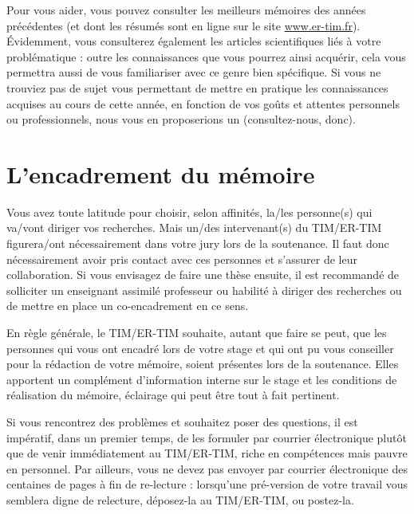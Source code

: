 \documentclass{report}
\begin{document}
Pour vous aider, vous pouvez consulter les meilleurs mémoires des années précédentes (et dont les résumés sont en ligne sur le site \url{www.er-tim.fr}). \'Evidemment, vous consulterez également les articles scientifiques liés à votre problématique : outre les connaissances que vous pourrez ainsi acquérir, cela vous permettra aussi de vous familiariser avec ce genre bien spécifique. Si vous ne trouviez pas de sujet vous permettant de mettre en pratique les connaissances acquises au cours de cette année, en fonction de vos goûts et attentes personnels ou professionnels, nous vous en proposerions un (consultez-nous, donc).

\section{L'encadrement du mémoire}
Vous avez toute latitude pour choisir, selon affinités, la/les personne(s) qui va/vont diriger vos recherches. Mais un/des intervenant(s) du TIM/ER-TIM figurera/ont nécessairement dans votre jury lors de la soutenance. Il faut donc nécessairement avoir pris contact avec ces personnes et s'assurer de leur collaboration. Si vous envisagez de faire une thèse ensuite, il est recommandé de solliciter un enseignant assimilé professeur ou habilité à diriger des recherches ou de mettre en place un co-encadrement en ce sens.

En règle générale, le TIM/ER-TIM souhaite, autant que faire se peut, que les personnes qui vous ont encadré lors de votre stage et qui ont pu vous conseiller pour la rédaction de votre mémoire, soient présentes lors de la soutenance. Elles apportent un complément d'information interne sur le stage et les conditions de réalisation du mémoire, éclairage qui peut être tout à fait pertinent.

Si vous rencontrez des problèmes et souhaitez poser des questions, il est impératif, dans un premier temps, de les formuler par courrier électronique plutôt que de venir immédiatement au TIM/ER-TIM, riche en compétences mais pauvre en personnel. Par ailleurs, vous ne devez pas envoyer par courrier électronique des centaines de pages à fin de re-lecture : lorsqu'une pré-version de votre travail vous semblera digne de relecture, déposez-la au TIM/ER-TIM, ou postez-la.
\end{document}
